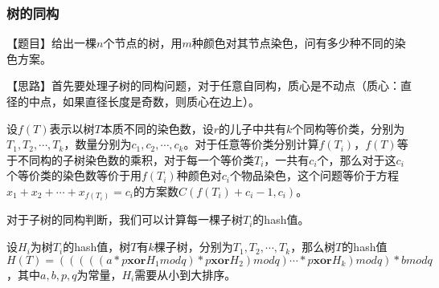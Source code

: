 \subsubsection{树的同构}
	【题目】给出一棵$n$个节点的树，用$m$种颜色对其节点染色，问有多少种不同的染色方案。\par
	【思路】首先要处理子树的同构问题，对于任意自同构，质心是不动点（质心：直径的中点，如果直径长度是奇数，则质心在边上）。	\par 
	设$f(T)$表示以树$T$本质不同的染色数，设$r$的儿子中共有$k$个同构等价类，分别为$T_1,T_2,\cdots,T_k$，数量分别为$c_1,c_2,\cdots,c_k$。对于任意等价类分别计算$f(T_i)$，$f(T)$等于不同构的子树染色数的乘积，对于每一个等价类$T_i$，一共有$c_i$个，那么对于这$c_i$个等价类的染色数等价于用$f(T_i)$种颜色对$c_i$个物品染色，这个问题等价于方程$x_1+x_2+\cdots+x_{f(T_i)}=c_i$的方案数$C(f(T_i)+c_i-1,c_i)$。\par
	对于子树的同构判断，我们可以计算每一棵子树$T_i$的hash值。\par
	设$H_i$为树$T_i$的hash值，树$T$有$k$棵子树，分别为$T_1,T_2,\cdots,T_k$，那么树$T$的hash值$H(T)=(((((a*p \mathbf{xor} H_1 mod q)*p \mathbf{xor} H_2) mod q)\cdots*p \mathbf{xor} H_k) mod q)*b mod q$，其中$a,b,p,q$为常量，$H_i$需要从小到大排序。 \par
	~\\
	~\\
